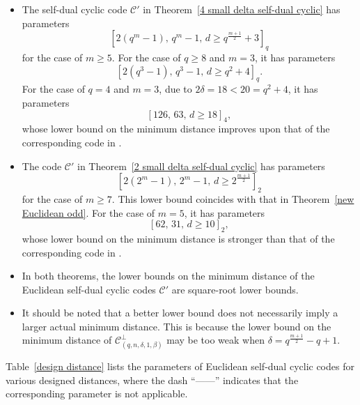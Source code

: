 \documentclass[journal,12pt,onecolumn]{IEEEtran}
\begin{document}
\begin{itemize}
    \item The self-dual cyclic code $\mathcal{C}'$ in Theorem~\ref{4 small delta self-dual cyclic} has parameters
    \[
    [2(q^m-1),\, q^m-1,\, d \ge q^{\frac{m+1}{2}} + 3]_q
    \]
    for the case of $m \ge 5$. For the case of $q \ge 8$ and $m = 3$, it has parameters
    \[
    [2(q^3-1),\, q^3-1,\, d \ge q^2 + 4]_q.
    \]
    For the case of $q = 4$ and $m = 3$, due to $2\delta = 18 < 20 = q^2 + 4$, it has parameters
    \[
    [126,\, 63,\, d \ge 18]_4,
    \]
    whose lower bound on the minimum distance improves upon that of the corresponding code in \cite{10856234}.

    \item The code $\mathcal{C}'$ in Theorem~\ref{2 small delta self-dual cyclic} has parameters
    \[
    [2(2^m-1),\, 2^m-1,\, d \ge 2^{\frac{m+1}{2}}]_2
    \]
    for the case of $m \ge 7$. This lower bound coincides with that in Theorem~\ref{new Euclidean odd}. For the case of $m = 5$, it has parameters
    \[
    [62,\, 31,\, d \ge 10]_2,
    \]
    whose lower bound on the minimum distance is stronger than that of the corresponding code in \cite{10856234}.

    \item In both theorems, the lower bounds on the minimum distance of the Euclidean self-dual cyclic codes $\mathcal{C}'$ are square-root lower bounds.

    \item It should be noted that a better lower bound does not necessarily imply a larger actual minimum distance. This is because the lower bound on the minimum distance of $\mathcal{C}_{(q,n,\delta,1,\beta)}^\perp$ may be too weak when $\delta = q^{\frac{m+1}{2}} - q + 1$.
\end{itemize}

Table~\ref{design distance} lists the parameters of Euclidean self-dual cyclic codes for various designed distances, where the dash ``——'' indicates that the corresponding parameter is not applicable.
\end{document}
